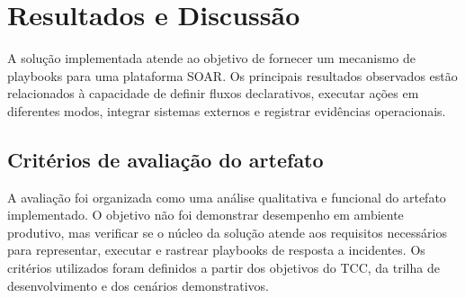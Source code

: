 \documentclass[article,a4paper,12pt,english,brazil,sumario=tradicional]{abntex2}
\begin{document}
\section{Resultados e Discussão}

A solução implementada atende ao objetivo de fornecer um mecanismo de playbooks para uma plataforma SOAR. Os principais resultados observados estão relacionados à capacidade de definir fluxos declarativos, executar ações em diferentes modos, integrar sistemas externos e registrar evidências operacionais.

\subsection{Critérios de avaliação do artefato}

A avaliação foi organizada como uma análise qualitativa e funcional do artefato implementado. O objetivo não foi demonstrar desempenho em ambiente produtivo, mas verificar se o núcleo da solução atende aos requisitos necessários para representar, executar e rastrear playbooks de resposta a incidentes. Os critérios utilizados foram definidos a partir dos objetivos do TCC, da trilha de desenvolvimento e dos cenários demonstrativos.
\end{document}

